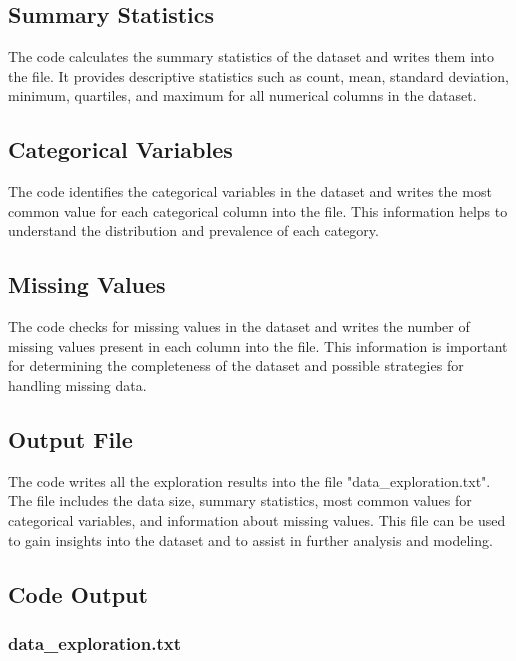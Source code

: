 \documentclass[11pt]{article}
\begin{document}
\subsection{Summary Statistics}
The code calculates the summary statistics of the dataset and writes them into the file. It provides descriptive statistics such as count, mean, standard deviation, minimum, quartiles, and maximum for all numerical columns in the dataset.

\subsection{Categorical Variables}
The code identifies the categorical variables in the dataset and writes the most common value for each categorical column into the file. This information helps to understand the distribution and prevalence of each category.

\subsection{Missing Values}
The code checks for missing values in the dataset and writes the number of missing values present in each column into the file. This information is important for determining the completeness of the dataset and possible strategies for handling missing data.

\subsection{Output File}
The code writes all the exploration results into the file "data\_exploration.txt". The file includes the data size, summary statistics, most common values for categorical variables, and information about missing values. This file can be used to gain insights into the dataset and to assist in further analysis and modeling.

\subsection{Code Output}

\subsubsection*{data\_exploration.txt}
\end{document}
